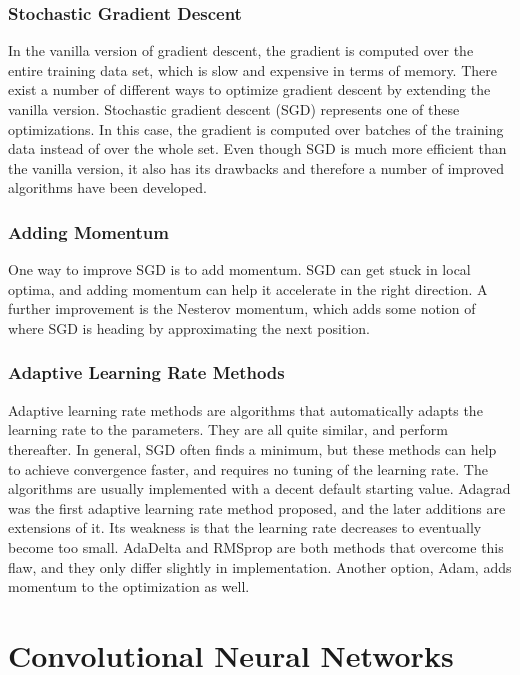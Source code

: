 \subsubsection{Stochastic Gradient Descent}

In the vanilla version of gradient descent, the gradient is computed over the entire training data set, which is slow and expensive in terms of memory. There exist a number of different ways to optimize gradient descent by extending the vanilla version. Stochastic gradient descent (SGD) represents one of these optimizations. In this case, the gradient is computed over batches of the training data instead of over the whole set. Even though SGD is much more efficient than the vanilla version, it also has its drawbacks and therefore a number of improved algorithms have been developed.

\subsubsection{Adding Momentum}

One way to improve SGD is to add momentum. SGD can get stuck in local optima, and adding momentum can help it accelerate in the right direction. A further improvement is the Nesterov momentum, which adds some notion of where SGD is heading by approximating the next position.

\subsubsection{Adaptive Learning Rate Methods}

Adaptive learning rate methods are algorithms that automatically adapts the learning rate to the parameters. They are all quite similar, and perform thereafter. In general, SGD often finds a minimum, but these methods can help to achieve convergence faster, and requires no tuning of the learning rate. The algorithms are usually implemented with a decent default starting value. Adagrad was the first adaptive learning rate method proposed, and the later additions are extensions of it. Its weakness is that the learning rate decreases to eventually become too small. AdaDelta and RMSprop are both methods that overcome this flaw, and they only differ slightly in implementation. Another option, Adam, adds momentum to the optimization as well.

\section{Convolutional Neural Networks} \label{conv-networks}

